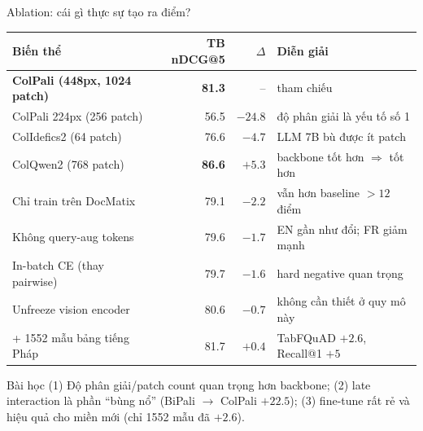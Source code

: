 \documentclass[aspectratio=169,10pt]{beamer}
\newcommand{\hot}[1]{\textcolor{mathred}{\textbf{#1}}}
\newcommand{\good}[1]{\textcolor{mathgreen}{\textbf{#1}}}
\begin{document}
\begin{frame}{Ablation: cái gì thực sự tạo ra điểm?}
  \centering
  \footnotesize
  \begin{tabular}{@{}lrrl@{}}
    \toprule
    Biến thể & TB nDCG@5 & $\Delta$ & Diễn giải \\
    \midrule
    \textbf{ColPali (448px, 1024 patch)} & \textbf{81.3} & -- & tham chiếu \\
    ColPali 224px (256 patch)      & 56.5 & \hot{$-24.8$} & độ phân giải là yếu tố số 1 \\
    ColIdefics2 (64 patch)         & 76.6 & $-4.7$ & LLM 7B bù được ít patch \\
    ColQwen2 (768 patch)           & \good{86.6} & \good{$+5.3$} & backbone tốt hơn $\Rightarrow$ tốt hơn \\
    \midrule
    Chỉ train trên DocMatix        & 79.1 & $-2.2$ & vẫn hơn baseline $>12$ điểm \\
    Không query-aug tokens         & 79.6 & $-1.7$ & EN gần như đổi; FR giảm mạnh \\
    In-batch CE (thay pairwise)    & 79.7 & $-1.6$ & hard negative quan trọng \\
    Unfreeze vision encoder        & 80.6 & $-0.7$ & không cần thiết ở quy mô này \\
    + 1552 mẫu bảng tiếng Pháp     & 81.7 & $+0.4$ & TabFQuAD $+2.6$, Recall@1 $+5$ \\
    \bottomrule
  \end{tabular}

  \vspace{3mm}
  \begin{block}{\small Bài học}
    \footnotesize
    (1) Độ phân giải/patch count quan trọng hơn backbone; (2) late interaction là phần ``bùng nổ'' (BiPali $\rightarrow$ ColPali $+22.5$);
    (3) fine-tune rất rẻ và hiệu quả cho miền mới (chỉ 1552 mẫu đã $+2.6$).
  \end{block}
\end{frame}
\end{document}
